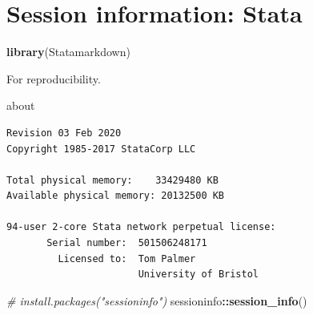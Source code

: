 \documentclass[
  10pt,
]{book}
\newenvironment{Shaded}{\begin{snugshade}}{\end{snugshade}}
\newcommand{\CommentTok}[1]{\textcolor[rgb]{0.56,0.35,0.01}{\textit{#1}}}
\newcommand{\KeywordTok}[1]{\textcolor[rgb]{0.13,0.29,0.53}{\textbf{#1}}}
\newcommand{\NormalTok}[1]{#1}
\newcommand{\OperatorTok}[1]{\textcolor[rgb]{0.81,0.36,0.00}{\textbf{#1}}}
\begin{document}
\hypertarget{session-information-stata}{%
\chapter*{Session information: Stata}\label{session-information-stata}}

\begin{Shaded}
\begin{Highlighting}[]
\KeywordTok{library}\NormalTok{(Statamarkdown)}
\end{Highlighting}
\end{Shaded}

For reproducibility.

\begin{Shaded}
\begin{Highlighting}[]
\NormalTok{about}
\end{Highlighting}
\end{Shaded}

\begin{verbatim}
Revision 03 Feb 2020
Copyright 1985-2017 StataCorp LLC

Total physical memory:    33429480 KB
Available physical memory: 20132500 KB

94-user 2-core Stata network perpetual license:
       Serial number:  501506248171
         Licensed to:  Tom Palmer
                       University of Bristol
\end{verbatim}

\begin{Shaded}
\begin{Highlighting}[]
\CommentTok{\# install.packages("sessioninfo")}
\NormalTok{sessioninfo}\OperatorTok{::}\KeywordTok{session\_info}\NormalTok{()}
\end{Highlighting}
\end{Shaded}
\end{document}

